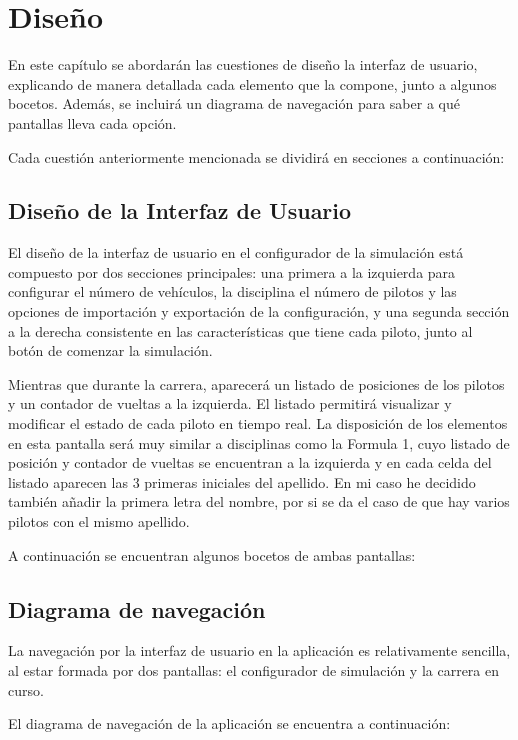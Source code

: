 \chapter{Diseño}

En este capítulo se abordarán las cuestiones de diseño la interfaz de usuario, explicando de manera detallada cada elemento que la compone, junto a algunos bocetos. Además, se incluirá un diagrama de navegación para saber a qué pantallas lleva cada opción.

\bigskip

Cada cuestión anteriormente mencionada se dividirá en secciones a continuación:

\section{Diseño de la Interfaz de Usuario}

El diseño de la interfaz de usuario en el configurador de la simulación está compuesto por dos secciones principales: una primera a la izquierda para configurar el número de vehículos, la disciplina el número de pilotos y las opciones de importación y exportación de la configuración, y una segunda sección a la derecha consistente en las características que tiene cada piloto, junto al botón de comenzar la simulación.

\bigskip

Mientras que durante la carrera, aparecerá un listado de posiciones de los pilotos y un contador de vueltas a la izquierda. El listado permitirá visualizar y modificar el estado de cada piloto en tiempo real. La disposición de los elementos en esta pantalla será muy similar a disciplinas como la Formula 1, cuyo listado de posición y contador de vueltas se encuentran a la izquierda y en cada celda del listado aparecen las 3 primeras iniciales del apellido. En mi caso he decidido también añadir la primera letra del nombre, por si se da el caso de que hay varios pilotos con el mismo apellido.

\bigskip

A continuación se encuentran algunos bocetos de ambas pantallas:


\section{Diagrama de navegación}

La navegación por la interfaz de usuario en la aplicación es relativamente sencilla, al estar formada por dos pantallas: el configurador de simulación y la carrera en curso.

\bigskip

El diagrama de navegación de la aplicación se encuentra a continuación:

